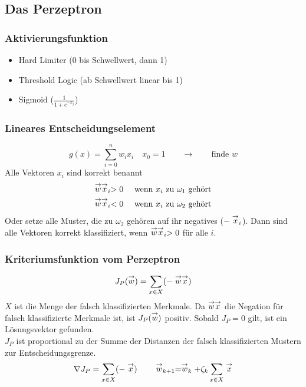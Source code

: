 \subsection{Das Perzeptron}


\subsubsection{Aktivierungsfunktion}

\begin{itemize}
	\item Hard Limiter (0 bis Schwellwert, dann 1)
	\item Threshold Logic (ab Schwellwert linear bis 1)
	\item Sigmoid ($\frac{1}{1 + e^{-x_j}}$)
\end{itemize}

\subsubsection*{Lineares Entscheidungselement}

$$g(x) = \sum\limits_{i=0}^n w_i x_i \quad x_0 = 1 \qquad \to \qquad \textrm{finde } w$$
Alle Vektoren $x_i$ sind korrekt benannt
\begin{eqnarray*}
\stackrel{\to}{w}\stackrel{\to}{x}_i > 0 && \textrm{ wenn } x_i \textrm{ zu } \omega_1 \textrm{ gehört} \\ \stackrel{\to}{w}\stackrel{\to}{x}_i < 0 && \textrm{ wenn } x_i \textrm{ zu } \omega_2 \textrm{ gehört}
\end{eqnarray*}
Oder setze alle Muster, die zu $\omega_2$ gehören auf ihr negatives ($-\stackrel{\to}{x}_i$). Dann sind alle Vektoren korrekt klassifiziert, wenn $\stackrel{\to}{w} \stackrel{\to}{x}_i > 0$ für alle $i$.
\subsubsection*{Kriteriumsfunktion vom Perzeptron}
$$J_P(\stackrel{\to}{w}) = \sum\limits_{x \in X} (- \stackrel{\to}{w} \stackrel{\to}{x})$$
$X$ ist die Menge der falsch klassifizierten Merkmale. Da $\stackrel{\to}{w} \stackrel{\to}{x}$ die Negation für falsch klassifizierte Merkmale ist, ist $J_P(\stackrel{\to}{w})$ positiv. Sobald $J_P = 0$ gilt, ist ein Lösungsvektor gefunden. \\ $J_P$ ist proportional zu der Summe der Distanzen der falsch klassifizierten Mustern zur Entscheidungsgrenze.
$$\nabla J_P = \sum\limits_{x \in X} (- \stackrel{\to}{x}) \qquad \stackrel{\to}{w}_{k+1} = \stackrel{\to}{w}_k + \zeta_k \sum\limits_{x \in X} \stackrel{\to}{x}$$

